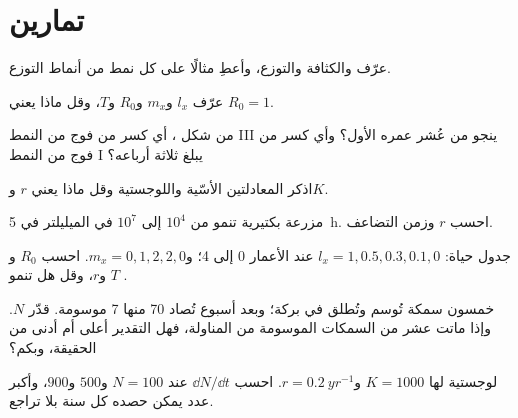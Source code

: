 \section{تمارين}

\begin{exercise}[$\star$]\label{exo:b1:populations:1}
عرّف  والكثافة والتوزع، وأعطِ مثالًا على كل نمط من أنماط
التوزع.
\end{exercise}

\begin{exercise}[$\star$]\label{exo:b1:populations:2}
عرّف $l_x$ و$m_x$ و$R_0$ و$T$، وقل ماذا يعني $R_0 = 1$.
\end{exercise}

\begin{exercise}[$\star$]\label{exo:b1:populations:3}
من شكل ، أي كسر من فوج من النمط III ينجو من عُشر عمره الأول؟
وأي كسر من فوج من النمط I يبلغ ثلاثة أرباعه؟
\end{exercise}

\begin{exercise}[$\star$]\label{exo:b1:populations:4}
اذكر المعادلتين الأسّية واللوجستية وقل ماذا يعني $r$ و$K$.
\end{exercise}

\begin{exercise}[$\star\star$]\label{exo:b1:populations:5}
مزرعة بكتيرية تنمو من $10^4$ إلى $10^7$  في الميليلتر
في \qty{5}{h}. احسب $r$ وزمن التضاعف.
\end{exercise}

\begin{exercise}[$\star\star$]\label{exo:b1:populations:6}
جدول حياة: $l_x = 1, 0.5, 0.3, 0.1, 0$ عند الأعمار 0 إلى 4؛ و$m_x = 0,
1, 2, 2, 0$. احسب $R_0$ و$T$ و$r$، وقل هل تنمو
.
\end{exercise}

\begin{exercise}[$\star\star$]\label{exo:b1:populations:7}
خمسون سمكة تُوسم وتُطلق في بركة؛ وبعد أسبوع تُصاد 70 منها 7
موسومة. قدّر $N$. وإذا ماتت عشر من السمكات الموسومة من المناولة،
فهل التقدير أعلى أم أدنى من الحقيقة، وبكم؟
\end{exercise}

\begin{exercise}[$\star\star$]\label{exo:b1:populations:8}
 لوجستية لها $K = 1000$ و$r = \qty{0.2}{yr^{-1}}$.
احسب $\dd N/\dd t$ عند $N = 100$ و$500$ و$900$، وأكبر عدد
يمكن حصده كل سنة بلا تراجع.
\end{exercise}

